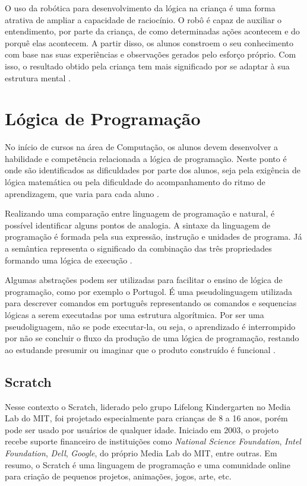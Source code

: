 O uso da robótica para desenvolvimento da lógica na criança é uma forma atrativa de ampliar a capacidade de raciocínio. O robô é
capaz de auxiliar o entendimento, por parte da criança, de como determinadas ações acontecem e do porquê elas acontecem. A partir
disso, os alunos constroem o seu conhecimento com base nas suas experiências e observações gerados pelo esforço próprio. Com isso,
o resultado obtido pela criança tem mais significado por se adaptar à sua estrutura mental \cite{zilli:2004}.

\section{Lógica de Programação}
No início de cursos na área de Computação, os alunos devem desenvolver a habilidade e competência relacionada a lógica de programação.
Neste ponto é onde são identificados as dificuldades por parte dos alunos, seja pela exigência de lógica matemática ou pela dificuldade
do acompanhamento do ritmo de aprendizagem, que varia para cada aluno .

Realizando uma comparação entre linguagem de programação e natural, é possível identificar alguns pontos de analogia. A sintaxe da linguagem
de programação é formada pela sua expressão, instrução e unidades de programa. Já a semântica representa o significado da combinação das três
propriedades formando uma lógica de execução \cite{ronnie:2013}.

Algumas abstrações podem ser utilizadas para facilitar o ensino de lógica de programação, como por exemplo o Portugol. É uma pseudolinguagem
utilizada para descrever comandos em português representando os comandos e sequencias lógicas a serem executadas por uma estrutura
algorítmica. Por ser uma pseudoliguagem, não se pode executar-la, ou seja, o aprendizado é interrompido por não se concluir o fluxo da
produção de uma lógica de programação, restando ao estudande presumir ou imaginar que o produto construído é funcional \cite{ronnie:2013}.

\subsection{Scratch}
Nesse contexto o Scratch, liderado pelo grupo Lifelong Kindergarten no Media Lab do MIT, foi projetado especialmente para crianças
de 8 a 16 anos, porém pode ser usado por usuários de qualquer idade. Iniciado em 2003, o projeto recebe suporte financeiro de
instituições como \textit{National Science Foundation}, \textit{Intel Foundation}, \textit{Dell}, \textit{Google}, do próprio 
Media Lab do MIT, entre outras. Em resumo, o Scratch é uma linguagem de programação e uma comunidade online para criação de
pequenos projetos, animações, jogos, arte, etc.

